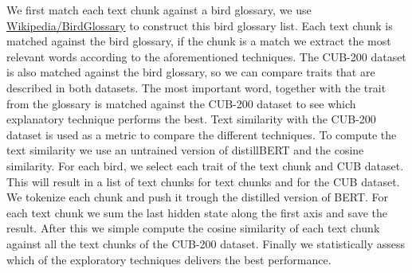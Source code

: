 \documentclass[a4paper, 12pt, oneside]{book} %
\begin{document}
We first match each text chunk against a bird glossary, we use \href{https://en.wikipedia.org/wiki/Glossary_of_bird_terms}{Wikipedia/BirdGlossary} to construct this bird glossary list.
Each text chunk is matched against the bird glossary, if the chunk is a match we extract the most relevant words according to the aforementioned techniques.
The CUB-200 dataset is also matched against the bird glossary, so we can compare traits that are described in both datasets.
The most important word, together with the trait from the glossary is matched against the CUB-200 dataset to see which explanatory technique performs the best.
Text similarity with the CUB-200 dataset is used as a metric to compare the different techniques.
To compute the text similarity we use an untrained version of distillBERT and the cosine similarity.
For each bird, we select each trait of the text chunk and CUB dataset.
This will result in a list of text chunks for text chunks and for the CUB dataset.
We tokenize each chunk and push it trough the distilled version of BERT.
For each text chunk we sum the last hidden state along the first axis and save the result.
After this we simple compute the cosine similarity of each text chunk against all the text chunks of the CUB-200 dataset.
Finally we statistically assess which of the exploratory techniques delivers the best performance.
\end{document}

